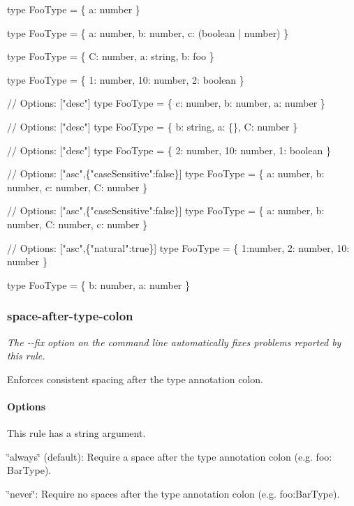 \begin{DoxyCode}
type FooType = \{ a: number \}

type FooType = \{ a: number, b: number, c: (boolean | number) \}

type FooType = \{ C: number, a: string, b: foo \}

type FooType = \{ 1: number, 10: number, 2: boolean \}

// Options: ["desc"]
type FooType = \{ c: number, b: number, a: number \}

// Options: ["desc"]
type FooType = \{ b: string, a: \{\}, C: number \}

// Options: ["desc"]
type FooType = \{ 2: number, 10: number, 1: boolean \}

// Options: ["asc",\{"caseSensitive":false\}]
type FooType = \{ a: number, b: number, c: number, C: number \}

// Options: ["asc",\{"caseSensitive":false\}]
type FooType = \{ a: number, b: number, C: number, c: number \}

// Options: ["asc",\{"natural":true\}]
type FooType = \{ 1:number, 2: number, 10: number \}

type FooType = \{ b: number, a: number \}
\end{DoxyCode}


\label{_eslint-plugin-flowtype-rules-space-after-type-colon}%
 \subsubsection*{{\ttfamily space-\/after-\/type-\/colon}}

{\itshape The {\ttfamily -\/-\/fix} option on the command line automatically fixes problems reported by this rule.}

Enforces consistent spacing after the type annotation colon.

\label{_eslint-plugin-flowtype-rules-space-after-type-colon-options}%
 \paragraph*{Options}

This rule has a string argument.


\begin{DoxyItemize}
\item {\ttfamily \char`\"{}always\char`\"{}} (default)\+: Require a space after the type annotation colon (e.\+g. foo\+: Bar\+Type).
\item {\ttfamily \char`\"{}never\char`\"{}}\+: Require no spaces after the type annotation colon (e.\+g. foo\+:Bar\+Type).
\end{DoxyItemize}

